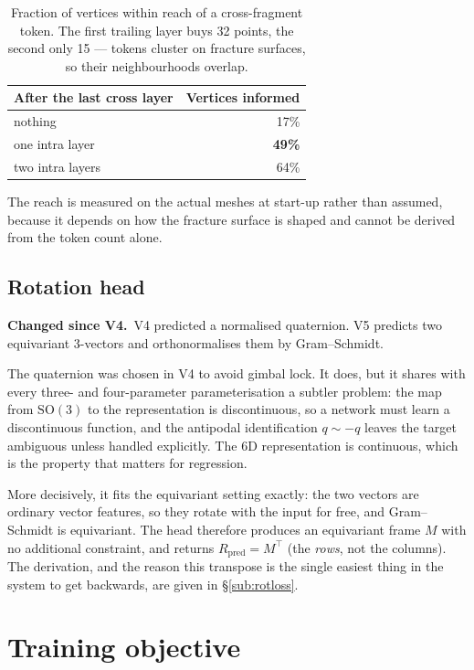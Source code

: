 \documentclass[11pt,a4paper]{report}
\newcommand{\change}[1]{\par\vspace{2pt}\noindent\textcolor{soft}{\small\textbf{Changed since V4.}\ #1}\par\vspace{2pt}}
\newcommand{\measured}[1]{\textbf{#1}}
\newcommand{\SOthree}{\mathrm{SO}(3)}
\begin{document}
\begin{table}[h]
\centering
\small
\begin{tabular}{lr}
\toprule
\textbf{After the last cross layer} & \textbf{Vertices informed} \\
\midrule
nothing & 17\% \\
one intra layer & \measured{49\%} \\
two intra layers & 64\% \\
\bottomrule
\end{tabular}
\caption{Fraction of vertices within reach of a cross-fragment token. The first
trailing layer buys 32 points, the second only 15 --- tokens cluster on fracture
surfaces, so their neighbourhoods overlap.}
\end{table}

The reach is measured on the actual meshes at start-up rather than assumed,
because it depends on how the fracture surface is shaped and cannot be derived
from the token count alone.

\subsection{Rotation head}
\label{sub:head}

\change{V4 predicted a normalised quaternion. V5 predicts two equivariant
3-vectors and orthonormalises them by Gram--Schmidt.}

The quaternion was chosen in V4 to avoid gimbal lock. It does, but it shares
with every three- and four-parameter parameterisation a subtler problem: the map
from $\SOthree$ to the representation is discontinuous, so a network must learn
a discontinuous function, and the antipodal identification $q \sim -q$ leaves
the target ambiguous unless handled explicitly. The 6D representation is
continuous, which is the property that matters for regression.

More decisively, it fits the equivariant setting exactly: the two vectors are
ordinary vector features, so they rotate with the input for free, and
Gram--Schmidt is equivariant. The head therefore produces an equivariant frame
$M$ with no additional constraint, and returns $R_{\text{pred}} = M^{\top}$
(the \emph{rows}, not the columns). The derivation, and the reason this
transpose is the single easiest thing in the system to get backwards, are given
in \S\ref{sub:rotloss}.

\section{Training objective}
\label{sec:objective}
\end{document}
